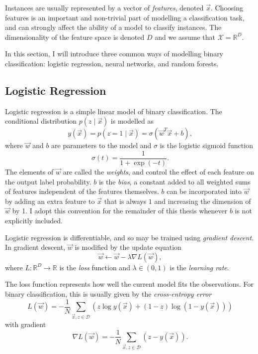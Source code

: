     Instances are usually represented by a vector of \emph{features}, denoted
    $\vec x$. Choosing features is an important and non-trivial part of
    modelling a classification task, and can strongly affect the ability of a
    model to classify instances. The dimensionality of the feature space is
    denoted $D$ and we assume that $\mathcal X = \mathbb{R}^D$.

    In this section, I will introduce three common ways of modelling binary
    classification: logistic regression, neural networks, and random forests.

    \subsection{Logistic Regression}
    \label{sec:logistic-regression}

        Logistic regression is a simple linear model of binary classification.
        The conditional distribution $p(z \mid \vec x)$ is modelled as
        \[
            y(\vec x) = p(z = 1 \mid \vec x) = \sigma(\vec w^T \vec x + b),
        \]
        where $\vec w$ and $b$ are parameters to the model and $\sigma$ is the
        logistic sigmoid function
        \[
            \sigma(t) = \frac{1}{1 + \exp(-t)}.
        \]
        The elements of $\vec w$ are called the \emph{weights}, and control the
        effect of each feature on the output label probability. $b$ is the
        \emph{bias}, a constant added to all weighted sums of features
        independent of the features themselves. $b$ can be incorporated into
        $\vec w$ by adding an extra feature to $\vec x$ that is always $1$ and
        increasing the dimension of $\vec w$ by 1. I adopt this convention for
        the remainder of this thesis whenever $b$ is not explicitly included.

        Logistic regression is differentiable, and so may be trained using
        \emph{gradient descent}. In gradient descent, $\vec w$ is modified by
        the update equation
        \[
            \vec w \leftarrow \vec w - \lambda \nabla L(\vec w),
        \]
        where $L : \mathbb{R}^D \to \mathbb{R}$ is the \emph{loss} function and
        $\lambda \in (0, 1)$ is the \emph{learning rate}.

        The loss function represents how well the current model fits the
        observations. For binary classification, this is usually given by the
        \emph{cross-entropy error}
        \[
            L(\vec w) = -\frac{1}{N} \sum_{\vec x, z \in \mathcal D} \left(
                z \log y(\vec x) + (1 - z) \log (1 - y(\vec x))
            \right)
        \]
        with gradient
        \[
            \nabla L(\vec w) = -\frac{1}{N}
                \sum_{\vec x, z \in \mathcal D} \left(z - y(\vec x)\right).
        \]

